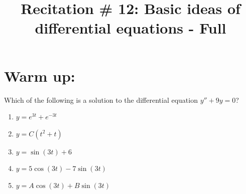 \documentclass[]{ximera}
\title{Recitation \# 12: Basic ideas of differential equations - Full}
\begin{document}
\begin{abstract}		\end{abstract}
\maketitle




\section{Warm up:}

Which of the following is a solution to the differential equation $y'' + 9y = 0$?
	\begin{enumerate}
	\item  $y=e^{3t}+e^{-3t}$
	\item  $y=C(t^2 + t)$
	\item  $y=\sin(3t) + 6$
	\item  $y=5 \cos(3t) - 7 \sin(3t)$
	\item  $y=A \cos(3t) + B \sin(3t)$ 
	\end{enumerate}
	
\end{document}
